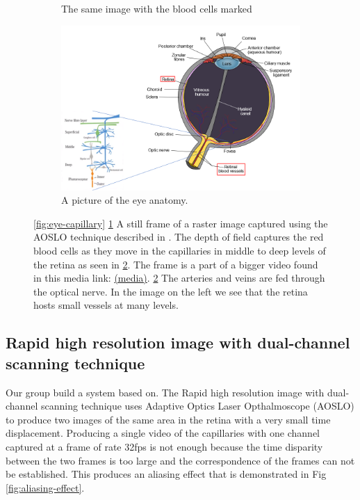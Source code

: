 \documentclass[]{article}
\begin{document}
\begin{figure}
\begin{subfigure}[t]{0.45\textwidth}
		\caption{The same image with the blood cells marked}
		\label{fig:eye-capillary-marked}
	\end{subfigure}
	\vfill
	\centering
	\begin{subfigure}[t]{\textwidth}
		\centering
		\includegraphics[width=\textwidth]{eye_anatomy.png}
		\caption{A picture of the eye anatomy\cite{eye_anatomy}.}
		\label{fig:eye-anatomy}
	\end{subfigure}
	\caption{\ref{fig:eye-capillary} \ref{fig:eye-capillary-marked} A still frame of a raster image captured using the AOSLO technique described in \cite{castro_rapid_2016}.
		The depth of field captures the red blood cells as they move in the capillaries in middle to deep levels of the retina as seen in \ref{fig:eye-anatomy}.
		The frame is a part of a bigger video found in this media link: \href{https://youtu.be/-7ew5sqOaTo}{(media)}.
	\ref{fig:eye-anatomy} The arteries and veins are fed through the optical nerve.
	In the image on the left\cite{noauthor_varying_nodate} we see that the retina hosts
	small vessels at many levels. }
	\label{fig:own-retinal-capillaries}
\end{figure}

\subsection{Rapid high resolution image with dual-channel scanning technique\cite{castro_rapid_2016}}
Our group build a system based on\cite{castro_rapid_2016}.
The Rapid high resolution image with dual-channel scanning technique uses Adaptive Optics Laser Opthalmoscope (AOSLO) to produce two images of the same area in the retina with a very small time displacement.
Producing a single video of the capillaries with one channel captured at a frame of rate 32fps is not
enough because the time disparity between the two frames is too large and the correspondence of the frames can not be established.
This produces an aliasing effect that is demonstrated in Fig \ref{fig:aliasing-effect}.
\end{document}
